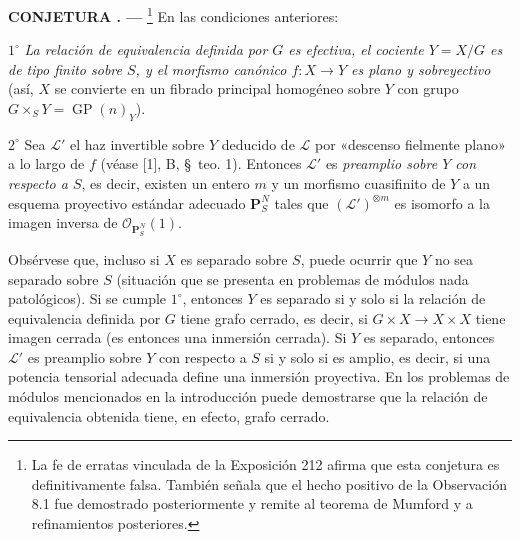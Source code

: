 \documentclass[11pt,twoside,openany]{book}
\numberwithin{equation}{section}
\theoremstyle{plain}
\theoremstyle{definition}
\theoremstyle{remark}
\newcommand{\result}[2]{%
  \par\medskip\noindent\textbf{#1%
  \if\relax\detokenize{#2}\relax\else\space#2\fi. ---}\enspace
}
\theoremstyle{plain}
\theoremstyle{definition}
\theoremstyle{remark}
\begin{document}
\result{CONJETURA}{8.1}\footnote{La fe de erratas vinculada de la Exposición 212
afirma que esta conjetura es definitivamente falsa. También señala que el
hecho positivo de la Observación 8.1 fue demostrado posteriormente y remite
al teorema de Mumford y a refinamientos posteriores.} En las condiciones
anteriores:

\smallskip
\noindent $1^\circ$ \emph{La relación de equivalencia definida por $G$ es
efectiva, el cociente $Y=X/G$ es de tipo finito sobre $S$, y el morfismo
canónico $f:X\to Y$ es plano y sobreyectivo} (así, $X$ se convierte en un
fibrado principal homogéneo sobre $Y$ con grupo
$G\times_S Y=\operatorname{GP}(n)_Y$).

\smallskip
\noindent $2^\circ$ Sea $\mathcal L'$ el haz invertible sobre $Y$ deducido de
$\mathcal L$ por «descenso fielmente plano» a lo largo de $f$ (véase [1], B,
\S~teo. 1). Entonces $\mathcal L'$ es \emph{preamplio sobre $Y$ con respecto
a $S$}, es decir, existen un entero $m$ y un morfismo cuasifinito de $Y$ a un
esquema proyectivo estándar adecuado $\mathbf P_S^N$ tales que
$(\mathcal L')^{\otimes m}$ es isomorfo a la imagen inversa de
$\mathcal O_{\mathbf P_S^N}(1)$.

Obsérvese que, incluso si $X$ es separado sobre $S$, puede ocurrir que $Y$ no
sea separado sobre $S$ (situación que se presenta en problemas de módulos
nada patológicos). Si se cumple $1^\circ$, entonces $Y$ es separado si y solo
si la relación de equivalencia definida por $G$ tiene grafo cerrado, es decir,
si $G\times X\to X\times X$ tiene imagen cerrada (es entonces una inmersión
cerrada). Si $Y$ es separado, entonces $\mathcal L'$ es preamplio sobre $Y$
con respecto a $S$ si y solo si es amplio, es decir, si una potencia tensorial
adecuada define una inmersión proyectiva. En los problemas de módulos
mencionados en la introducción puede demostrarse que la relación de
equivalencia obtenida tiene, en efecto, grafo cerrado.
\end{document}
